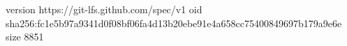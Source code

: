 version https://git-lfs.github.com/spec/v1
oid sha256:fc1e5b97a9341d0f08bf06fa4d13b20ebe91e4a658cc75400849697b179a9e6e
size 8851
